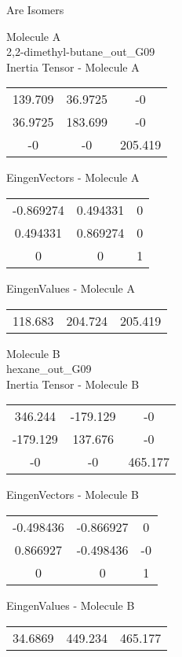 \begin{center}
\vtab
\vtab
\textcolor{NavyBlue}{\Large Are Isomers}
\end{center}
\newpage
\begin{multicols}{2}
\begin{center}
Molecule A \\ 
2,2-dimethyl-butane\_out\_G09
\\
Inertia Tensor - Molecule A \\
\vtab
\begin{tabular}{|c c c|}
139.709	 & 	36.9725	 & 	-0	 \\
36.9725	 & 	183.699	 & 	-0	 \\
-0	 & 	-0	 & 	205.419
\end{tabular}

\vtab
 EingenVectors - Molecule A     \\
\vtab
\begin{tabular}{|c c c|}
-0.869274	 & 	0.494331	 & 	0	 \\
0.494331	 & 	0.869274	 & 	0	 \\
0	 & 	0	 & 	1
\end{tabular}

\vtab
 EingenValues - Molecule A     \\
\vtab
\begin{tabular}{|c c c|}
118.683	 & 	204.724	 & 	205.419
\end{tabular}
\columnbreak

Molecule B \\ 
hexane\_out\_G09
\\
Inertia Tensor - Molecule B \\
\vtab
\begin{tabular}{|c c c|}
346.244	 & 	-179.129	 & 	-0	 \\
-179.129	 & 	137.676	 & 	-0	 \\
-0	 & 	-0	 & 	465.177
\end{tabular}

\vtab
 EingenVectors - Molecule B     \\
\vtab
\begin{tabular}{|c c c|}
-0.498436	 & 	-0.866927	 & 	0	 \\
0.866927	 & 	-0.498436	 & 	-0	 \\
0	 & 	0	 & 	1
\end{tabular}

\vtab
 EingenValues - Molecule B     \\
\vtab
\begin{tabular}{|c c c|}
34.6869	 & 	449.234	 & 	465.177
\end{tabular}

\end{center}
\end{multicols}
